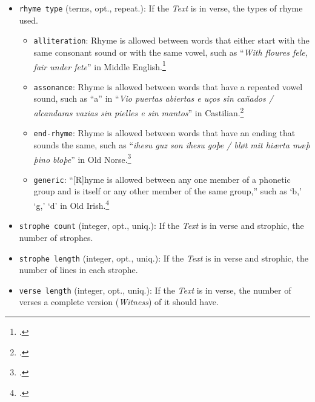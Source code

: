 \begin{itemize}
        \begin{itemize}
            \item \texttt{French alexandrine}: line consisting of 2 half-lines each of 6 syllables, total of 12 syllables.
            \item \texttt{dodecasyllabe}: line consisting of 12 syllables.
            \item \texttt{decasyllabe}: line consisting of 10 syllables.
            \item \texttt{octosyllabe}: line consisting of 8 syllables.
            \item \texttt{hexasyllabe}: line consisting of 6 syllables.
            \item \texttt{pentasyllabe}: line consisting of 5 syllables.
        \end{itemize}
    \item \texttt{rhyme type} (terms, opt., repeat.): If the \textit{Text} is in verse, the types of rhyme used.
        \begin{itemize}
            \item \texttt{alliteration}: Rhyme is allowed between words that either start with the same consonant sound or with the same vowel, such as ``\textit{With floures fele, fair under fete}'' in Middle English.\footcite[][396]{Davis2002}
            \item \texttt{assonance}: Rhyme is allowed between words that have a repeated vowel sound, such as ``a'' in ``\textit{Vio puertas abiertas e uços sin cañados / alcandaras vazias sin pielles e sin mantos}'' in Castilian.\footcite[][364]{Gornall1995}
            \item \texttt{end-rhyme}: Rhyme is allowed between words that have an ending that sounds the same, such as ``\textit{ihesu guz son ihesu goþe / bløt mit hiærta mæþ þino bloþe}'' in Old Norse.\footcite[][423]{Layher2008}
            \item \texttt{generic}: ``[R]hyme is allowed between any one member of a phonetic group and is itself or any other member of the same group,'' such as `b,' `g,' `d' in Old Irish.\footcite[][822]{McKie1997}
        \end{itemize}
    \item \texttt{strophe count} (integer, opt., uniq.): If the \textit{Text} is in verse and strophic, the number of strophes.
    \item \texttt{strophe length} (integer, opt., uniq.): If the \textit{Text} is in verse and strophic, the number of lines in each strophe.
    \item \texttt{verse length} (integer, opt., uniq.): If the \textit{Text} is in verse, the number of verses a complete version (\textit{Witness}) of it should have.
\end{itemize}


